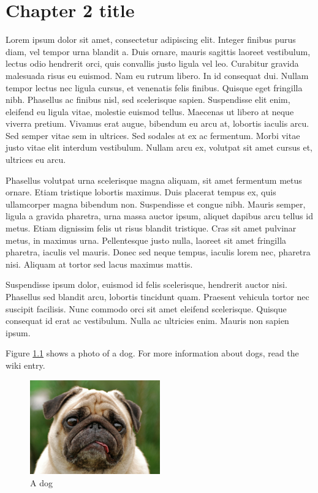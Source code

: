 \chapter{Chapter 2 title}
\label{chap:chapter2}

\graphicspath{{chapters/2/img/}}

Lorem ipsum dolor sit amet, consectetur adipiscing elit. Integer finibus purus diam, vel tempor urna blandit a. Duis ornare, mauris sagittis laoreet vestibulum, lectus odio hendrerit orci, quis convallis justo ligula vel leo. Curabitur gravida malesuada risus eu euismod. Nam eu rutrum libero. In id consequat dui. Nullam tempor lectus nec ligula cursus, et venenatis felis finibus. Quisque eget fringilla nibh. Phasellus ac finibus nisl, sed scelerisque sapien. Suspendisse elit enim, eleifend eu ligula vitae, molestie euismod tellus. Maecenas ut libero at neque viverra pretium. Vivamus erat augue, bibendum eu arcu at, lobortis iaculis arcu. Sed semper vitae sem in ultrices. Sed sodales at ex ac fermentum. Morbi vitae justo vitae elit interdum vestibulum. Nullam arcu ex, volutpat sit amet cursus et, ultrices eu arcu.

Phasellus volutpat urna scelerisque magna aliquam, sit amet fermentum metus ornare. Etiam tristique lobortis maximus. Duis placerat tempus ex, quis ullamcorper magna bibendum non. Suspendisse et congue nibh. Mauris semper, ligula a gravida pharetra, urna massa auctor ipsum, aliquet dapibus arcu tellus id metus. Etiam dignissim felis ut risus blandit tristique. Cras sit amet pulvinar metus, in maximus urna. Pellentesque justo nulla, laoreet sit amet fringilla pharetra, iaculis vel mauris. Donec sed neque tempus, iaculis lorem nec, pharetra nisi. Aliquam at tortor sed lacus maximus mattis.

Suspendisse ipsum dolor, euismod id felis scelerisque, hendrerit auctor nisi. Phasellus sed blandit arcu, lobortis tincidunt quam. Praesent vehicula tortor nec suscipit facilisis. Nunc commodo orci sit amet eleifend scelerisque. Quisque consequat id erat ac vestibulum. Nulla ac ultricies enim. Mauris non sapien ipsum.

Figure \ref{fig:dog} shows a photo of a dog. For more information about dogs, read the wiki entry.\cite{wiki}

\begin{figure}[h]
  \centering
  \includegraphics[width=0.5\textwidth]{dog}
  \caption{A dog}
  \label{fig:dog}
\end{figure}
